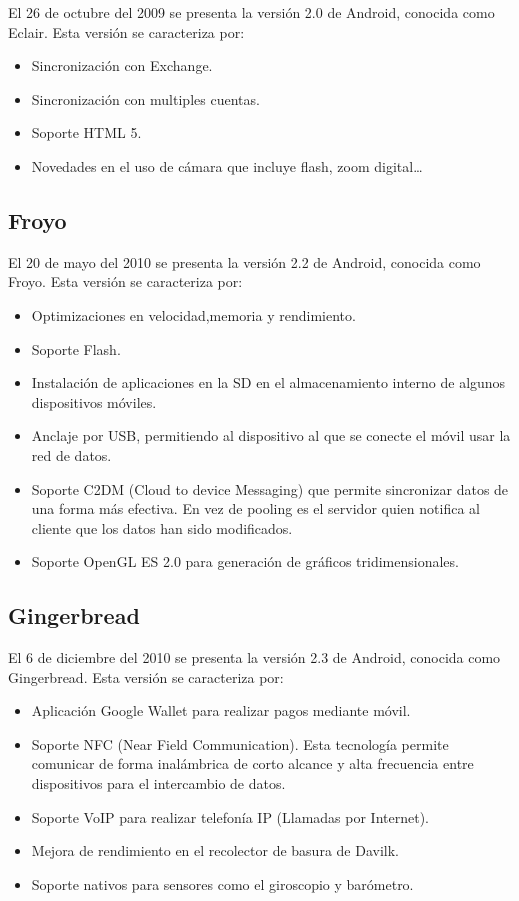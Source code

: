 El 26 de octubre del 2009 se presenta la versión 2.0 de Android, conocida como Eclair. Esta versión se caracteriza por:

\begin{itemize}
\item Sincronización con Exchange.
\item Sincronización con multiples cuentas.
\item Soporte HTML 5.
\item Novedades en el uso de cámara que incluye flash, zoom digital\ldots
\end{itemize}

\subsection{Froyo} 

El 20 de mayo del 2010 se presenta la versión 2.2 de Android, conocida como Froyo. Esta versión se caracteriza por:
\begin{itemize}
\item Optimizaciones en velocidad,memoria y rendimiento.
\item Soporte Flash.
\item Instalación de aplicaciones en la SD en el almacenamiento interno de algunos dispositivos móviles.
\item Anclaje por USB, permitiendo al dispositivo al que se conecte el móvil usar la red de datos.
\item Soporte C2DM (Cloud to device Messaging) que permite sincronizar datos de una forma más efectiva. En vez de pooling es el servidor quien notifica al cliente que los datos han sido modificados.
\item Soporte OpenGL ES 2.0 para generación de gráficos tridimensionales.
\end{itemize}

\subsection{Gingerbread}

El 6 de diciembre del 2010 se presenta la versión 2.3 de Android, conocida como Gingerbread. Esta versión se caracteriza por:
\begin{itemize}
\item Aplicación Google Wallet para realizar pagos mediante móvil.
\item Soporte NFC (Near Field Communication). Esta tecnología permite comunicar de forma inalámbrica de corto alcance y alta frecuencia entre dispositivos para el intercambio de datos.
\item Soporte VoIP para realizar telefonía IP (Llamadas por Internet).
\item Mejora de rendimiento en el recolector de basura de Davilk.
\item Soporte nativos para sensores como el giroscopio y barómetro.
\end{itemize}

